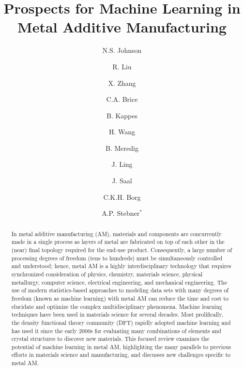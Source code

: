 \documentclass[twocolumn,superscriptaddress,nofootinbib]{revtex4-1}
\begin{document}
\title{Prospects for Machine Learning in Metal Additive Manufacturing}
\author{N.S. Johnson}
\author{R. Liu}
\author{X. Zhang}
\author{C.A. Brice}
\author{B. Kappes}

\author{H. Wang}

\author{B. Meredig}
\author{J. Ling}
\author{J. Saal}
\author{C.K.H. Borg}


\author{A.P. Stebner$^*$}


\begin{abstract}
In metal additive manufacturing (AM), materials and components are concurrently made in a single process as layers of metal are fabricated on top of each other in the (near) final topology required for the end-use product.
Consequently, a large number of processing degrees of freedom (tens to hundreds) must be simultaneously controlled and understood; hence, metal AM is a highly interdisciplinary technology that requires synchronized consideration of physics, chemistry, materials science, physical metallurgy, computer science, electrical engineering, and mechanical engineering.
The use of modern statistics-based approaches to modeling data sets with many degrees of freedom (known as machine learning) with metal AM can reduce the time and cost to elucidate and optimize the complex multidisciplinary phenomena.
Machine learning techniques have been used in materials science for several decades.
Most prolifically, the density functional theory community (DFT) rapidly adopted machine learning and has used it since the early 2000s for evaluating many combinations of elements and crystal structures to discover new materials.
This focused review examines the potential of machine learning in metal AM, highlighting the many parallels to previous efforts in materials science and manufacturing, and discusses new challenges specific to metal AM.
\end{abstract}


\maketitle

%


% 
%



\end{document}

